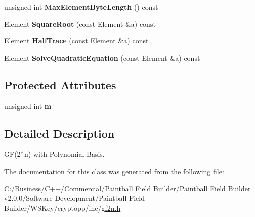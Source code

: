 \begin{DoxyCompactItemize}
\item 
\hypertarget{class_g_f2_n_p_a6287e6aaf7478f86fcb3862f8a96ad22}{
unsigned int {\bfseries MaxElementByteLength} () const }
\label{class_g_f2_n_p_a6287e6aaf7478f86fcb3862f8a96ad22}

\item 
\hypertarget{class_g_f2_n_p_a62bedcfaaa2d3d4d53a2d9f835e79a0c}{
Element {\bfseries SquareRoot} (const Element \&a) const }
\label{class_g_f2_n_p_a62bedcfaaa2d3d4d53a2d9f835e79a0c}

\item 
\hypertarget{class_g_f2_n_p_a4c6a29a61cff7a6b70165c71099b3a7f}{
Element {\bfseries HalfTrace} (const Element \&a) const }
\label{class_g_f2_n_p_a4c6a29a61cff7a6b70165c71099b3a7f}

\item 
\hypertarget{class_g_f2_n_p_ab12c34c56a6764fd3015ed66e5ec1cea}{
Element {\bfseries SolveQuadraticEquation} (const Element \&a) const }
\label{class_g_f2_n_p_ab12c34c56a6764fd3015ed66e5ec1cea}

\end{DoxyCompactItemize}
\subsection*{Protected Attributes}
\begin{DoxyCompactItemize}
\item 
\hypertarget{class_g_f2_n_p_ade49365898ce399a879beb3f409b4e5b}{
unsigned int {\bfseries m}}
\label{class_g_f2_n_p_ade49365898ce399a879beb3f409b4e5b}

\end{DoxyCompactItemize}


\subsection{Detailed Description}
GF(2$^\wedge$n) with Polynomial Basis. 

The documentation for this class was generated from the following file:\begin{DoxyCompactItemize}
\item 
C:/Business/C++/Commercial/Paintball Field Builder/Paintball Field Builder v2.0.0/Software Development/Paintball Field Builder/WSKey/cryptopp/inc/\hyperlink{gf2n_8h}{gf2n.h}\end{DoxyCompactItemize}
